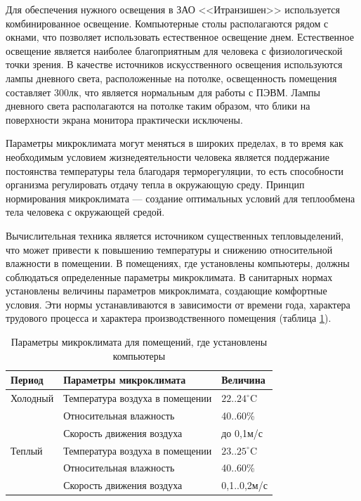 \documentclass[14pt,a4paper]{reportmod}
\begin{document}
Для обеспечения нужного освещения в ЗАО <<Итранзишен>> используется комбинированное освещение. Компьютерные столы располагаются рядом с окнами, что позволяет использовать естественное освещение днем. Естественное освещение является наиболее благоприятным для человека с физиологической точки зрения. В качестве источников искусственного освещения используются лампы дневного света, расположенные на потолке, освещенность помещения составляет 300лк, что является нормальным для работы с ПЭВМ.  Лампы дневного света располагаются на потолке таким образом, что блики на поверхности экрана монитора практически исключены.


Параметры микроклимата могут меняться в широких пределах, в то время как необходимым условием жизнедеятельности человека является поддержание постоянства температуры тела благодаря терморегуляции, то есть способности организма регулировать отдачу тепла в окружающую среду. Принцип нормирования микроклимата --- создание оптимальных условий для теплообмена тела человека с окружающей средой.

Вычислительная техника является источником существенных тепловыделений, что может привести к повышению температуры и снижению относительной влажности в помещении. В помещениях, где установлены компьютеры, должны соблюдаться определенные параметры микроклимата. В санитарных нормах \cite{otthree} установлены величины параметров микроклимата, создающие комфортные условия. Эти нормы устанавливаются в зависимости от времени года, характера трудового процесса и характера производственного помещения (таблица \ref{table:microclimat}).

\begin{table}
  \caption{Параметры микроклимата для помещений, где установлены компьютеры}
  \begin{tabular}{|m{3cm}|m{7cm}|m{3cm}|}
    \hline
    \bfseries{Период} &
    \bfseries{Параметры микроклимата} &
    \bfseries{Величина} \\
    \hline
    Холодный & Температура воздуха в помещении & $22..24^{\circ}$C \\
    \hline
    & Относительная влажность & 40..60\% \\
    \hline
    & Скорость движения воздуха & до 0,1м/с \\
    \hline
    Теплый & Температура воздуха в помещении & $23..25^{\circ}$C \\
    \hline
    & Относительная влажность & 40..60\% \\
    \hline
    & Скорость движения воздуха & 0,1..0,2м/с \\
    \hline
  \end{tabular}
  \label{table:microclimat}
\end{table}
\end{document}
